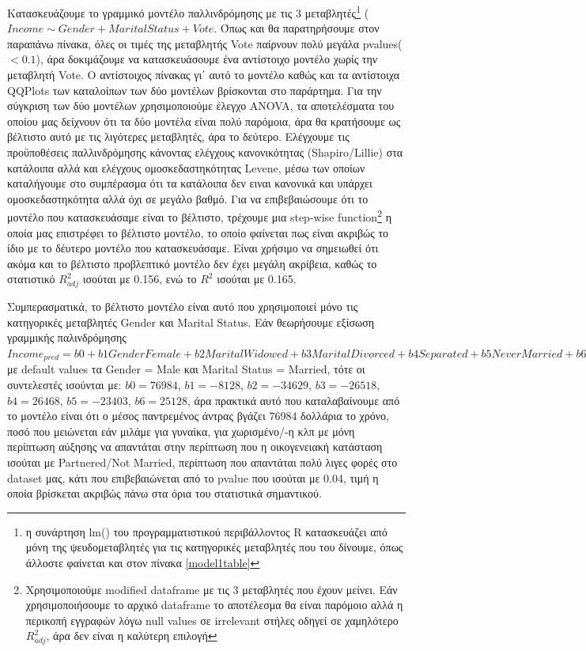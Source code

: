 \documentclass[10pt, letterpaper]{article}
\begin{document}
        \newpage
        \par Κατασκευάζουμε το γραμμικό μοντέλο παλλινδρόμησης με τις 3 μεταβλητές\footnote{η συνάρτηση lm() του προγραμματιστικού περιβάλλοντος R κατασκευάζει από μόνη της ψευδομεταβλητές για τις κατηγορικές μεταβλητές που του δίνουμε, όπως άλλοστε φαίνεται και στον πίνακα \ref{model1table}} ($Income \sim Gender + Marital Status + Vote $. Όπως και θα παρατηρήσουμε στον παραπάνω πίνακα, όλες οι τιμές της μεταβλητής Vote παίρνουν πολύ μεγάλα pvalues($<0.1$), άρα δοκιμάζουμε να κατασκευάσουμε ένα αντίστοιχο μοντέλο χωρίς την μεταβλητή Vote. Ο αντίστοιχος πίνακας γι΄ αυτό το μοντέλο καθώς και τα αντίστοιχα QQPlots των καταλοίπων των δύο μοντέλων βρίσκονται στο παράρτημα. Για την σύγκριση των δύο μοντέλων χρησιμοποιούμε έλεγχο ANOVA, τα αποτελέσματα του οποίου μας δείχνουν ότι τα δύο μοντέλα είναι πολύ παρόμοια, άρα θα κρατήσουμε ως βέλτιστο αυτό με τις λιγότερες μεταβλητές, άρα το δεύτερο. Ελέγχουμε τις προϋποθέσεις παλλινδρόμησης κάνοντας ελέγχους κανονικότητας (Shapiro/Lillie) στα κατάλοιπα αλλά και ελέγχους ομοσκεδαστηκότητας Levene\cite{levene}, μέσω των οποίων καταλήγουμε στο συμπέρασμα ότι τα κατάλοιπα δεν ειναι κανονικά και υπάρχει ομοσκεδαστηκότητα αλλά όχι σε μεγάλο βαθμό. Για να επιβεβαιώσουμε ότι το μοντέλο που κατασκευάσαμε είναι το βέλτιστο, τρέχουμε μια step-wise function\footnote{Χρησιμοποιούμε modified dataframe με τις 3 μεταβλητές που έχουν μείνει. Εάν χρησιμοποιήσουμε το αρχικό dataframe το αποτέλεσμα θα είναι παρόμοιο αλλά η περικοπή εγγραφών λόγω null values σε irrelevant στήλες οδηγεί σε χαμηλότερο $R_{adj}^2$, άρα δεν είναι η καλύτερη επιλογή} η οποία μας επιστρέφει το βέλτιστο μοντέλο, το οποίο φαίνεται πως είναι ακριβώς το ίδιο με το δέυτερο μοντέλο που κατασκευάσαμε. Είναι χρήσιμο να σημειωθεί ότι ακόμα και το βέλτιστο προβλεπτικό μοντέλο δεν έχει μεγάλη ακρίβεια, καθώς το στατιστικό $R_{adj}^2$ ισούται με 0.156, ενώ το $R^2$ ισούται με 0.165.

        \par Συμπερασματικά, το βέλτιστο μοντέλο είναι αυτό που χρησιμοποιεί μόνο τις κατηγορικές μεταβλητές Gender και Marital Status. Εάν θεωρήσουμε εξίσωση γραμμικής παλινδρόμησης $Income_{pred} = b0 + b1GenderFemale + b2MaritalWidowed + b3MaritalDivorced + b4Separated + b5NeverMarried + b6Partnered$ με default values τα Gender = Male και Marital Status = Married, τότε οι συντελεστές ισούνται με: $b0=76984$, $b1 = -8128$, $b2 = -34629$, $b3 = -26518$, $b4 = 26468$, $b5 = -23403$, $b6 = 25128$, άρα πρακτικά αυτό που καταλαβαίνουμε από το μοντέλο είναι ότι ο μέσος παντρεμένος άντρας βγάζει 76984 δολλάρια το χρόνο, ποσό που μειώνεται εάν μιλάμε για γυναίκα, για χωρισμένο/-η κλπ με μόνη περίπτωση αύξησης να απαντάται στην περίπτωση που η οικογενειακή κατάσταση ισούται με Partnered/Not Married, περίπτωση που απαντάται πολύ λιγες φορές στο dataset μας, κάτι που επιβεβαιώνεται από το pvalue που ισούται με 0.04, τιμή η οποία βρίσκεται ακριβώς πάνω στα όρια του στατιστικά σημαντικού.
    
\end{document}
